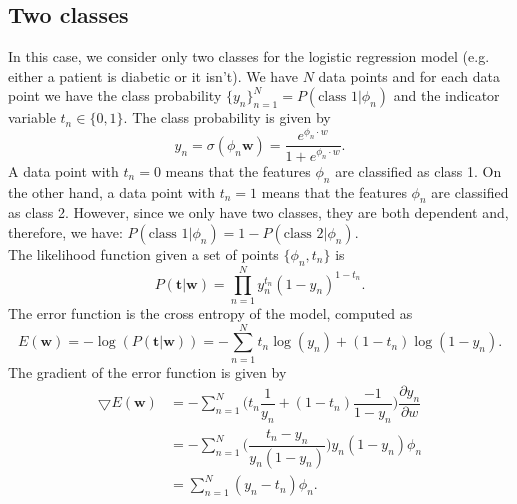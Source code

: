 \documentclass{article}
\begin{document}
\subsection{Two classes}
In this case, we consider only two classes for the logistic regression model (e.g. either a patient is diabetic or it isn't). We have $N$ data points and for each data point we have the class probability $\{y_n\}_{n=1}^N = P(\text{class } 1|\phi_n)$ and the indicator variable $t_n\in\{0,1\}$. 
The class probability is given by
\begin{equation}
    y_n = \sigma(\phi_n \textbf{w}) = \dfrac{e^{\phi_n \cdot w}}{1+e^{\phi_n \cdot w}}.
\end{equation}
A data point with $t_n=0$ means that the features $\phi_n$ are classified as class 1. On the other hand, a data point with $t_n=1$ means that the features $\phi_n$ are classified as class 2. However, since we only have two classes, they are both dependent and, therefore, we have: $P(\text{class } 1|\phi_n)=1-P(\text{class } 2|\phi_n)$. \\ \noindent
The likelihood function given a set of points $\{\phi_n,t_n\}$ is
\begin{equation}
    P(\textbf{t}|\textbf{w}) = \prod_{n=1}^N y_n^{t_n}(1-y_n)^{1-t_n}.
\end{equation}
The error function is the cross entropy of the model, computed as
\begin{equation}
    E(\textbf{w}) = -\log(P(\textbf{t}|\textbf{w})) = -\sum_{n=1}^N t_n \log(y_n) + (1-t_n) \log(1-y_n).
\end{equation}
The gradient of the error function is given by
\begin{equation}
\begin{split}
    \bigtriangledown E(\textbf{w}) &= 
    -\sum_{n=1}^N \bigg(t_n \dfrac{1}{y_n} +(1-t_n)\dfrac{-1}{1-y_n}\bigg)\dfrac{\partial y_n}{\partial w} \\
    &= -\sum_{n=1}^N \bigg(\dfrac{t_n-y_n}{y_n (1-y_n)} \bigg)y_n (1-y_n) \phi_n \\
    &=\sum_{n=1}^N (y_n-t_n)\phi_n.
    \end{split}
\end{equation}
\end{document}
